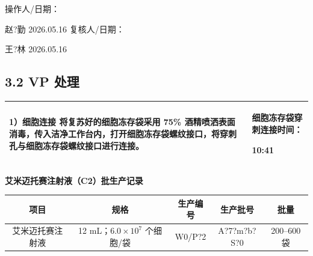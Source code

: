 \documentclass[UTF8,10pt,a4paper,fontset=fandol]{ctexart}
\newcommand{\fieldvalue}[1]{#1}
\newcommand{\handwritten}[1]{#1}
\begin{document}
\vspace{0.2em}

操作人/日期：

\fieldvalue{\handwritten{赵?勤}}
\quad
\fieldvalue{\handwritten{2026.05.16}}
\hfill
复核人/日期：

\fieldvalue{\handwritten{王?林}}
\quad
\fieldvalue{\handwritten{2026.05.16}}

\subsection{3.2 VP 处理}

\begin{tabularx}{\textwidth}{|X|p{}|}
\hline
1）细胞连接\newline
将复苏好的细胞冻存袋采用 75\% 酒精喷洒表面消毒，传入洁净工作台内，打开细胞冻存袋螺纹接口，将穿刺孔与细胞冻存袋螺纹接口进行连接。 &
细胞冻存袋穿刺连接时间：

\fieldvalue{\handwritten{10:41}} \\
\hline
\end{tabularx}


\newpage

\begin{center}
\textbf{艾米迈托赛注射液（C2）批生产记录}
\end{center}

\begin{tabularx}{\textwidth}{|c|c|c|c|c|}
\hline
\textbf{项目} & \textbf{规格} & \textbf{生产编号} & \textbf{生产批号} & \textbf{批量} \\
\hline
艾米迈托赛注射液 & 12 mL；$6.0 \times 10^{7}$ 个细胞/袋 &
\fieldvalue{\handwritten{W0/P?2}} &
\fieldvalue{\handwritten{A?7?m?b?S?0}} &
200--600 袋 \\
\hline
\end{tabularx}
\end{document}
